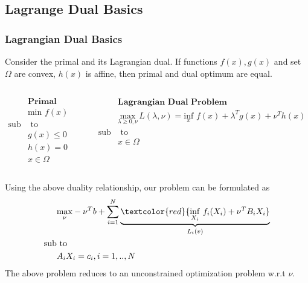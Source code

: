 \documentclass{beamer}
\newcommand\FontviNine{\fontsize{9}{7.2}\selectfont}
\begin{document}
\subsection{Lagrange Dual Basics}
\begin{frame}
\frametitle{Lagrangian Dual Basics}
\FontviNine
Consider the primal and its Lagrangian dual. If functions $f(x), g(x)$ and set $\Omega$ are convex, $h(x)$ is affine, then primal and dual optimum are equal.

\begin{columns}[t] %

\begin{align*}
&\textbf{Primal Problem}\\
& \mathrm{ min } \,\, f(x)\\
\text{sub} & \text{ to} \\
& g(x) \leq 0 \\
& h(x) = 0 \\
& x \in \Omega 
\end{align*}

\begin{align*}
&\textbf{Lagrangian Dual Problem}\\
&\underset{\lambda \geq 0 , \nu}{\mathrm{max}}\,L(\lambda,\nu) = \underset{x}{\mathrm{inf}} \,\, f(x) + {\lambda }^{T} g(x) + {\nu}^{T} h(x)\\
\text{sub} & \text{ to}\\
& x \in \Omega 
\end{align*}
\end{columns}
Using the above duality relationship, our problem can be formulated as 
\begin{align*}
&\underset{\nu}{\mathrm{max}}-{\nu}^{T}b + \sum_{i=1}^{N} \underbrace{\textcolor{red}{ \underset{X_i}{\mathrm{inf}} \,\,f_{i}(X_i) + {\nu}^{T} B_i X_i}}_{L_{i}(v)}  \\
\text{sub} & \text{ to} \\
&A_i X_i = c_i , i = 1,..,N 
\end{align*}
The above problem reduces to an unconstrained optimization problem w.r.t $\nu$.
\end{frame}
\end{document}
